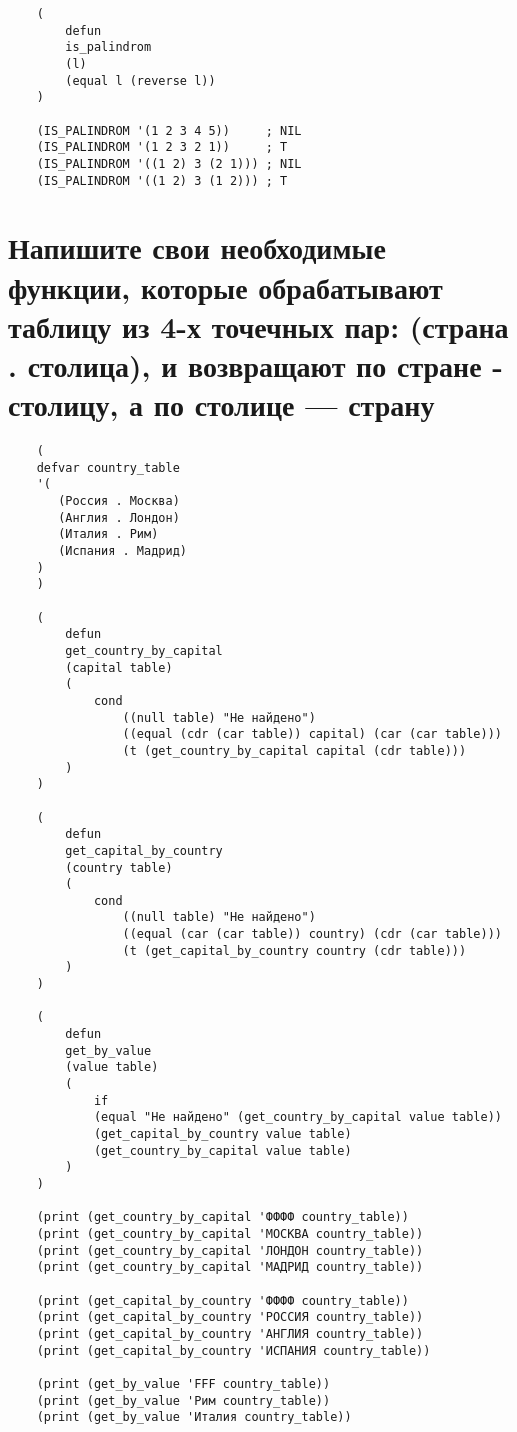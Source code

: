 \begin{lstlisting}
    (
        defun
        is_palindrom
        (l)
        (equal l (reverse l))
    )

    (IS_PALINDROM '(1 2 3 4 5))     ; NIL
    (IS_PALINDROM '(1 2 3 2 1))     ; T
    (IS_PALINDROM '((1 2) 3 (2 1))) ; NIL
    (IS_PALINDROM '((1 2) 3 (1 2))) ; T
\end{lstlisting}


\section{Напишите свои необходимые функции, которые обрабатывают таблицу из 4-х точечных пар: (страна . столица), и возвращают по стране - столицу, а по столице — страну}

\begin{lstlisting}
    (
    defvar country_table
    '(
       (Россия . Москва)
       (Англия . Лондон)
       (Италия . Рим)
       (Испания . Мадрид)
    )
    )
    
    (
        defun
        get_country_by_capital
        (capital table)
        (
            cond 
                ((null table) "Не найдено")
                ((equal (cdr (car table)) capital) (car (car table)))
                (t (get_country_by_capital capital (cdr table)))
        )
    )
    
    (
        defun
        get_capital_by_country
        (country table)
        (
            cond 
                ((null table) "Не найдено")
                ((equal (car (car table)) country) (cdr (car table)))
                (t (get_capital_by_country country (cdr table)))
        )
    )
    
    (
        defun
        get_by_value
        (value table)
        (
            if
            (equal "Не найдено" (get_country_by_capital value table))
            (get_capital_by_country value table)
            (get_country_by_capital value table)
        )
    )
    
    (print (get_country_by_capital 'ФФФФ country_table))
    (print (get_country_by_capital 'МОСКВА country_table))
    (print (get_country_by_capital 'ЛОНДОН country_table))
    (print (get_country_by_capital 'МАДРИД country_table))
    
    (print (get_capital_by_country 'ФФФФ country_table))
    (print (get_capital_by_country 'РОССИЯ country_table))
    (print (get_capital_by_country 'АНГЛИЯ country_table))
    (print (get_capital_by_country 'ИСПАНИЯ country_table))
    
    (print (get_by_value 'FFF country_table))
    (print (get_by_value 'Рим country_table))
    (print (get_by_value 'Италия country_table))
\end{lstlisting}

